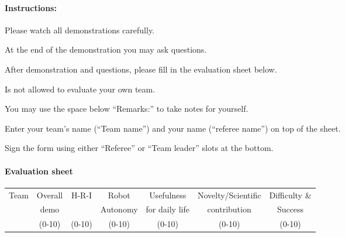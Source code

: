 \paragraph{Instructions:}
\begin{compactenum}
\item Please watch all demonstrations carefully.
\item At the end of the demonstration you may ask questions.
\item After demonstration and questions, please fill in the evaluation sheet below.
\item Is not allowed to evaluate your own team.
\item You may use the space below ``Remarks:'' to take notes for yourself.
\item Enter your team's name (``Team name'') and your name (``referee name'') on top of the sheet.
\item Sign the form using either ``Referee'' or ``Team leader'' slots at the bottom.
\end{compactenum}

\paragraph{Evaluation sheet}
\begin{center}
\begingroup
\newcommand\tableTEAMS{}
\def\do#1{\appto\tableTEAMS{#1 & & & & & &  \\\hline}}%
\expandafter\docsvlist\expandafter{\TEAMSSTAGEONE}
\begin{tabular}{|l|c|c|c|c|c|c|}
  \hline
  \multirow{3}{*}{Team}
  &  Overall &  H-R-I  &  Robot    &  Usefulness    & Novelty/Scientific         & Difficulty \&  \\
  &  demo &    &  Autonomy &  for daily life    & contribution        & Success  \\
  &  (0-10)  &  (0-10) &  (0-10)   & (0-10) & (0-10) & (0-10) \\
  \hline
  \hline
  \tableTEAMS
\end{tabular}
\endgroup
\end{center}

